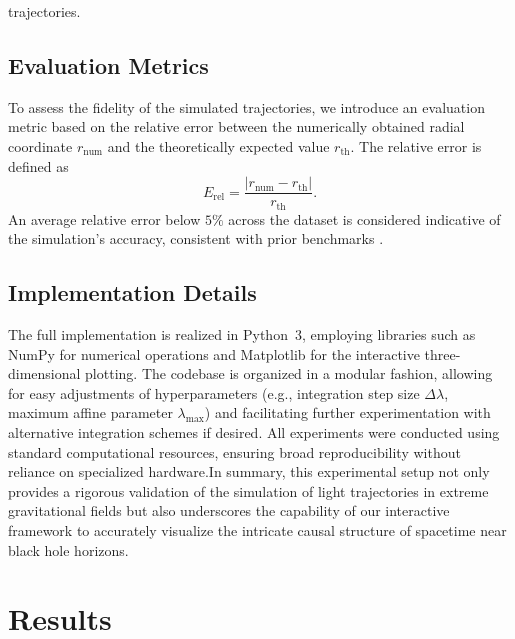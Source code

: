 \documentclass{article}
\begin{document}
trajectories.\subsection{Evaluation Metrics}To assess the fidelity of the simulated trajectories, we introduce an evaluation metric based on the relative error between the numerically obtained radial coordinate $r_{\text{num}}$ and the theoretically expected value $r_{\text{th}}$. The relative error is defined as\begin{equation}E_{\text{rel}} = \frac{|r_{\text{num}}-r_{\text{th}}|}{r_{\text{th}}}.\end{equation}An average relative error below $5\%$ across the dataset is considered indicative of the simulation's accuracy, consistent with prior benchmarks \cite{ref1, ref2}.\subsection{Implementation Details}The full implementation is realized in Python~3, employing libraries such as NumPy for numerical operations and Matplotlib for the interactive three-dimensional plotting. The codebase is organized in a modular fashion, allowing for easy adjustments of hyperparameters (e.g., integration step size $\Delta \lambda$, maximum affine parameter $\lambda_{\max}$) and facilitating further experimentation with alternative integration schemes if desired. All experiments were conducted using standard computational resources, ensuring broad reproducibility without reliance on specialized hardware.In summary, this experimental setup not only provides a rigorous validation of the simulation of light trajectories in extreme gravitational fields but also underscores the capability of our interactive framework to accurately visualize the intricate causal structure of spacetime near black hole horizons.\section{Results}
\end{document}

